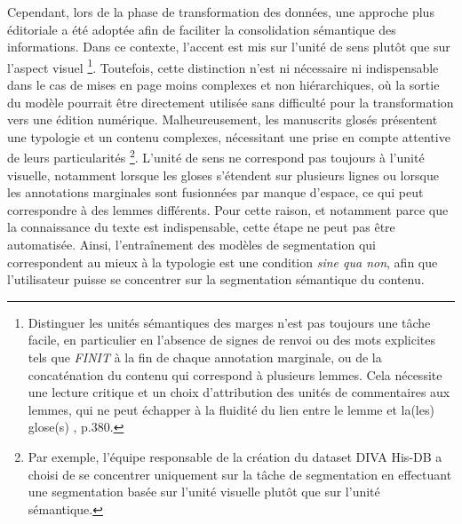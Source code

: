 \documentclass[a4paper, twoside, 12pt]{book}
\begin{document}
Cependant, lors de la phase de transformation des données, une approche plus \og{}éditoriale\fg{} a été adoptée afin de faciliter la consolidation sémantique des informations. Dans ce contexte, l'accent est mis sur l'unité de sens plutôt que sur l'aspect visuel \footnote{Distinguer les unités sémantiques des marges n'est pas toujours une tâche facile, en particulier en l'absence de signes de renvoi ou des mots explicites tels que \textit{FINIT} à la fin de chaque annotation marginale, ou de la concaténation du contenu qui correspond à plusieurs lemmes. Cela nécessite une lecture critique et un choix d'attribution des unités de commentaires aux lemmes, qui ne peut échapper à la fluidité du lien entre le lemme et la(les) glose(s) \cite{oSullivan2017lemma}, p.380.}. Toutefois, cette distinction n'est ni nécessaire ni indispensable dans le cas de mises en page moins complexes et non hiérarchiques, où la sortie du modèle pourrait être directement utilisée sans difficulté pour la transformation vers une édition numérique. Malheureusement, les manuscrits glosés présentent une typologie et un contenu complexes, nécessitant une prise en compte attentive de leurs particularités \footnote{Par exemple, l'équipe responsable de la création du dataset DIVA His-DB a choisi de se concentrer uniquement sur la tâche de segmentation en effectuant une segmentation basée sur l'unité visuelle plutôt que sur l'unité sémantique. }. L'unité de sens ne correspond pas toujours à l'unité visuelle, notamment lorsque les gloses s'étendent sur plusieurs lignes ou lorsque les annotations marginales sont fusionnées par manque d'espace, ce qui peut correspondre à des lemmes différents. Pour cette raison, et notamment parce que la connaissance du texte est indispensable, cette étape ne peut pas être automatisée. Ainsi, l'entraînement des modèles de segmentation qui correspondent au mieux à la typologie est une condition \textit{sine qua non}, afin que l'utilisateur puisse se concentrer sur la segmentation sémantique du contenu.\\
\end{document}
